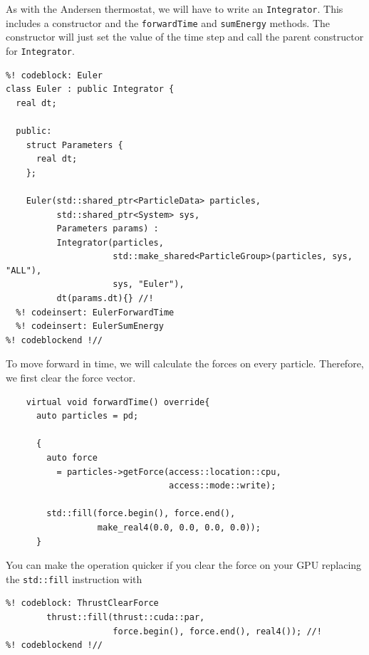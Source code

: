 As with the Andersen thermostat, we will have to write an \texttt{Integrator}. 
This includes a constructor and the \texttt{forwardTime} and \texttt{sumEnergy} 
methods. The constructor will just set the value of the time step and call the 
parent constructor for \texttt{Integrator}.
\begin{lstlisting}
%! codeblock: Euler
class Euler : public Integrator {
  real dt;

  public:
    struct Parameters {
      real dt;
    };

    Euler(std::shared_ptr<ParticleData> particles,
          std::shared_ptr<System> sys,
          Parameters params) :
          Integrator(particles,
                     std::make_shared<ParticleGroup>(particles, sys, "ALL"),
                     sys, "Euler"),
          dt(params.dt){} //!
  %! codeinsert: EulerForwardTime
  %! codeinsert: EulerSumEnergy
%! codeblockend !//
\end{lstlisting}
To move forward in time, we will calculate the forces on every particle. 
Therefore, we first clear the force vector.
\begin{lstlisting}
    virtual void forwardTime() override{
      auto particles = pd;

      {
        auto force
          = particles->getForce(access::location::cpu,
                                access::mode::write);

        std::fill(force.begin(), force.end(),
                  make_real4(0.0, 0.0, 0.0, 0.0));
      }
\end{lstlisting}
You can make the operation quicker if you clear the force on your GPU replacing 
the \texttt{std::fill} instruction with
\begin{lstlisting}
%! codeblock: ThrustClearForce
        thrust::fill(thrust::cuda::par,
                     force.begin(), force.end(), real4()); //!
%! codeblockend !//
\end{lstlisting}

